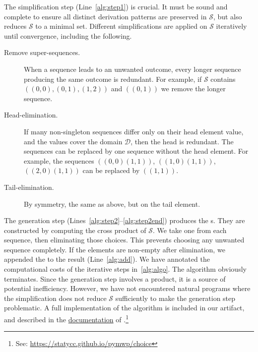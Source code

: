 The simplification step (Line~\ref{alg:step1}) is crucial. It must be
sound and complete to ensure all distinct
derivation patterns are preserved in \(\mathcal{S}\), but also
reduces \(\mathcal{S}\) to a minimal set. Different simplifications
are applied on \(\mathcal{S}\) iteratively until convergence,
including the following.

\begin{description}

\item[Remove super-sequences.] When a sequence leads to an unwanted outcome,
every longer sequence producing the same outcome is redundant. For example, if
\(\mathcal{S}\) contains \(((0,0),(0,1),(1,2))\) and \(((0,1))\) we
remove the longer sequence.

\item[Head-elimination.] If many non-singleton sequences differ only on their
head element value, and the values cover the domain \(\mathcal{D}\), then the
head is redundant. The sequences can be replaced by one sequence without the
head element. For example, the sequences \(((0,0)(1,1))\), \(((1,0)(1,1))\),
\(((2,0)(1,1))\) can be replaced by \(((1,1))\).

\item[Tail-elimination.] By symmetry, the same as above, but on the tail
element.

\end{description}

The generation step (Lines~\ref{alg:step2}--\ref{alg:step2end}) produces the
s. They are constructed by computing the cross product of
\(\mathcal{S}\). We take one  from each
sequence, then eliminating those choices. This prevents choosing any unwanted
sequence completely. If the  elements are non-empty after
elimination, we appended the  to the result
(Line~\ref{alg:add}). We have annotated the computational costs of the iterative
steps in~\autoref{alg:algo}. The algorithm obviously
terminates. Since the generation step involves a product, it
is a source of potential inefficiency. However, we have not encountered natural
programs where the simplification does not reduce \(\mathcal{S}\)
sufficiently to make the generation step problematic. A full implementation of
the algorithm is included in our artifact, and described in the
\href{https://statycc.github.io/pymwp/choice}{documentation} of
.\footnote{See: \url{https://statycc.github.io/pymwp/choice}}

